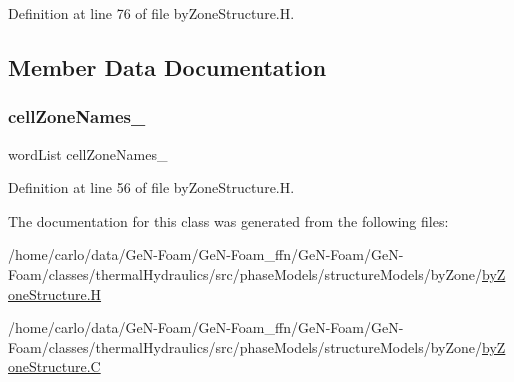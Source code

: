 Definition at line 76 of file by\+Zone\+Structure.\+H.



\subsection{Member Data Documentation}
\mbox{\label{classFoam_1_1structureModels_1_1byZone_a5b0fbb3119d554e93cccce00ec273cbb}} 
\subsubsection{\texorpdfstring{cell\+Zone\+Names\+\_\+}{cellZoneNames\_}}
{\footnotesize\ttfamily word\+List cell\+Zone\+Names\+\_\+\hspace{0.3cm}{\ttfamily [protected]}}



Definition at line 56 of file by\+Zone\+Structure.\+H.



The documentation for this class was generated from the following files\+:\begin{DoxyCompactItemize}
\item 
/home/carlo/data/\+Ge\+N-\/\+Foam/\+Ge\+N-\/\+Foam\+\_\+ffn/\+Ge\+N-\/\+Foam/\+Ge\+N-\/\+Foam/classes/thermal\+Hydraulics/src/phase\+Models/structure\+Models/by\+Zone/\hyperlink{byZoneStructure_8H}{by\+Zone\+Structure.\+H}\item 
/home/carlo/data/\+Ge\+N-\/\+Foam/\+Ge\+N-\/\+Foam\+\_\+ffn/\+Ge\+N-\/\+Foam/\+Ge\+N-\/\+Foam/classes/thermal\+Hydraulics/src/phase\+Models/structure\+Models/by\+Zone/\hyperlink{byZoneStructure_8C}{by\+Zone\+Structure.\+C}\end{DoxyCompactItemize}
